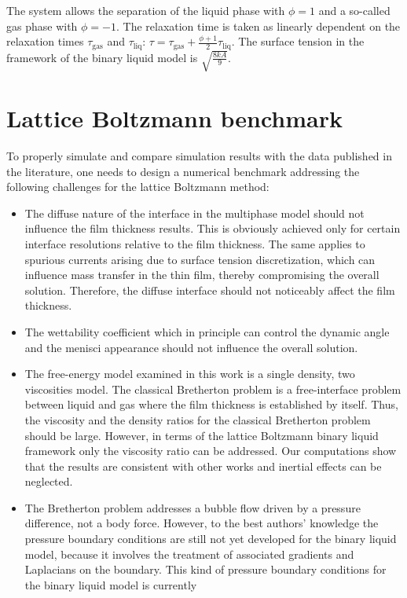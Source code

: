 \documentclass[preprint,12pt]{elsarticle}
\begin{document}
The system allows the separation of the liquid
phase with $\phi=1$ and a so-called gas phase with $\phi=-1$. The
relaxation time is taken as linearly dependent on the relaxation
times $\tau_{\mathrm{gas}}$ and $\tau_{\mathrm{liq}}$:
$\tau=\tau_{\mathrm{gas}}+\frac{\phi+1}{2}\tau_{\mathrm{liq}}$.
The surface tension in the framework of the binary liquid model is $\sqrt{\frac{8 k A}{9}}$.

\section{Lattice Boltzmann benchmark}
To properly simulate and compare simulation results with the data
published in the literature, one needs to design a numerical benchmark addressing
the following challenges for the lattice Boltzmann method:
\begin{itemize}
 \item The diffuse nature of the interface in the multiphase model should not
influence the film thickness results. This is obviously achieved only for certain
interface resolutions relative to the film thickness. The same applies to spurious
currents arising due to surface tension discretization, which
can influence mass transfer in the thin film, thereby compromising the
overall solution. Therefore, the diffuse interface should not noticeably affect the film
thickness.
 \item The wettability coefficient which in principle can control the
dynamic angle and the menisci appearance \cite{pagonabarraga-finger} should not
influence the overall solution.
 \item The free-energy model examined in this work is a single density, two
viscosities model. The classical Bretherton problem is a free-interface problem between liquid and
gas
where the film thickness is established by itself. Thus, the viscosity and the density ratios for
the
classical
Bretherton problem should
be large. However, in terms of the lattice Boltzmann binary liquid framework only the viscosity
ratio can be addressed. Our computations show that the results are consistent with other works and
inertial effects can be neglected.
  \item The Bretherton problem addresses a bubble flow driven by a pressure
difference, not a body force. However, to the best authors' knowledge the pressure boundary
conditions are still not yet developed for the binary liquid model, because it involves the
treatment of associated gradients and Laplacians on the boundary.
This kind of pressure boundary conditions for the binary liquid model is currently

\end{itemize}
\end{document}
